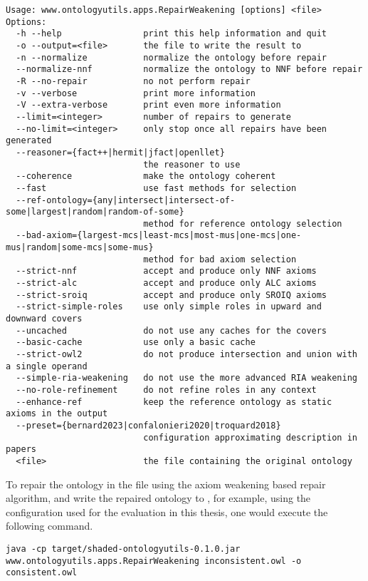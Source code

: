 \begin{lstlisting}
Usage: www.ontologyutils.apps.RepairWeakening [options] <file>
Options:
  -h --help                print this help information and quit
  -o --output=<file>       the file to write the result to
  -n --normalize           normalize the ontology before repair
  --normalize-nnf          normalize the ontology to NNF before repair
  -R --no-repair           no not perform repair
  -v --verbose             print more information
  -V --extra-verbose       print even more information
  --limit=<integer>        number of repairs to generate
  --no-limit=<integer>     only stop once all repairs have been generated
  --reasoner={fact++|hermit|jfact|openllet}
                           the reasoner to use
  --coherence              make the ontology coherent
  --fast                   use fast methods for selection
  --ref-ontology={any|intersect|intersect-of-some|largest|random|random-of-some}
                           method for reference ontology selection
  --bad-axiom={largest-mcs|least-mcs|most-mus|one-mcs|one-mus|random|some-mcs|some-mus}
                           method for bad axiom selection
  --strict-nnf             accept and produce only NNF axioms
  --strict-alc             accept and produce only ALC axioms
  --strict-sroiq           accept and produce only SROIQ axioms
  --strict-simple-roles    use only simple roles in upward and downward covers
  --uncached               do not use any caches for the covers
  --basic-cache            use only a basic cache
  --strict-owl2            do not produce intersection and union with a single operand
  --simple-ria-weakening   do not use the more advanced RIA weakening
  --no-role-refinement     do not refine roles in any context
  --enhance-ref            keep the reference ontology as static axioms in the output
  --preset={bernard2023|confalonieri2020|troquard2018}
                           configuration approximating description in papers
  <file>                   the file containing the original ontology
\end{lstlisting}

To repair the ontology in the file  using the axiom weakening based repair algorithm, and write the repaired ontology to , for example, using the configuration used for the evaluation in this thesis, one would execute the following command.

\begin{lstlisting}
java -cp target/shaded-ontologyutils-0.1.0.jar www.ontologyutils.apps.RepairWeakening inconsistent.owl -o consistent.owl
\end{lstlisting}
